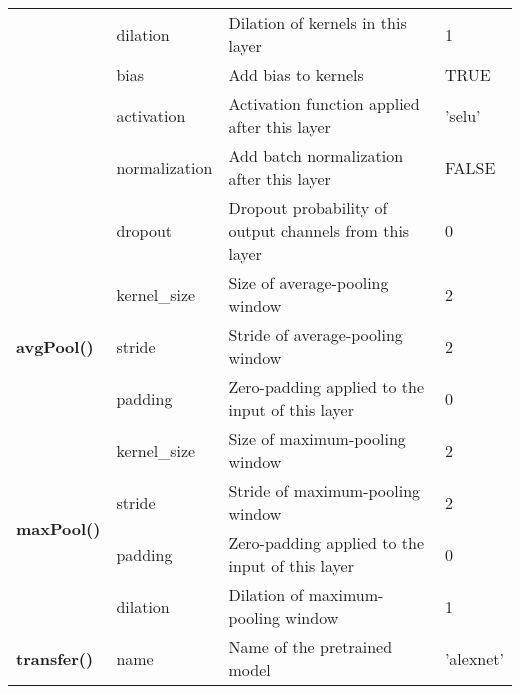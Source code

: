 \documentclass{article}
\begin{document}
\begin{table}[]
\begin{tabular}{llll}
		& dilation      & Dilation of kernels in this layer                                                                                                 & 1         \\
		& bias          & Add bias to kernels                                                                                                               & TRUE      \\
		& activation    & Activation function applied after this layer                                                                                      & 'selu'    \\
		& normalization & Add batch normalization after this layer                                                                                          & FALSE     \\
		& dropout       & Dropout probability of output channels from this layer                                                                            & 0         \\ \hline
		\multirow{3}{*}{\textbf{avgPool()}}  & kernel\_size  & Size of average-pooling window                                                                                                    & 2         \\
		& stride        & Stride of average-pooling window                                                                                                  & 2         \\
		& padding       & Zero-padding applied to the input of this layer                                                                                   & 0         \\ \hline
		\multirow{4}{*}{\textbf{maxPool()}}  & kernel\_size  & Size of maximum-pooling window                                                                                                    & 2         \\
		& stride        & Stride of maximum-pooling window                                                                                                  & 2         \\
		& padding       & Zero-padding applied to the input of this layer                                                                                   & 0         \\
		& dilation      & Dilation of maximum-pooling window                                                                                                & 1         \\ \hline
		\multirow{3}{*}{\textbf{transfer()}} & name          & Name of the pretrained model                                                                                                      & 'alexnet' \\

\end{tabular}
\end{table}
\end{document}
